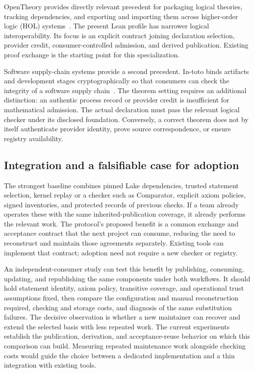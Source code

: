 \documentclass[11pt]{article}
\begin{document}
OpenTheory provides directly relevant precedent for packaging logical
theories, tracking dependencies, and exporting and importing them across higher-order logic (HOL)
systems~\citep{hurd2009}. The present Lean profile has narrower logical
interoperability. Its focus is an explicit contract joining declaration
selection, provider credit, consumer-controlled admission, and derived
publication. Existing proof exchange is the starting point for this
specialization.

Software supply-chain systems provide a second precedent. In-toto binds
artifacts and development stages cryptographically so that consumers can
check the integrity of a software supply chain~\citep{intoto2019}. The theorem
setting requires an additional distinction: an authentic process record or
provider credit is insufficient for mathematical admission. The actual
declaration must pass the relevant logical checker under its disclosed
foundation. Conversely, a correct theorem does not by itself authenticate
provider identity, prove source correspondence, or ensure registry
availability.

\subsection{Integration and a falsifiable case for adoption}

The strongest baseline combines pinned Lake dependencies, trusted statement
selection, kernel replay or a checker such as Comparator, explicit axiom
policies, signed inventories, and protected records of previous checks. If a
team already operates these with the same inherited-publication coverage, it
already performs the relevant work. The protocol's proposed benefit is a
common exchange and acceptance contract that the next project can consume,
reducing the need to reconstruct and maintain those agreements separately.
Existing tools can implement that contract; adoption need not require a new
checker or registry.

An independent-consumer study can test this benefit by publishing, consuming,
updating, and republishing the same components under both workflows. It should
hold statement identity, axiom policy, transitive coverage, and operational
trust assumptions fixed, then compare the configuration and manual
reconstruction required, checking and storage costs, and diagnosis of the same
substitution failures. The decisive observation is whether a new maintainer
can recover and extend the selected basis with less repeated work. The current
experiments establish the publication, derivation, and acceptance-reuse
behavior on which this comparison can build. Measuring repeated maintenance
work alongside checking costs would guide the choice between a dedicated
implementation and a thin integration with existing tools.
\end{document}
